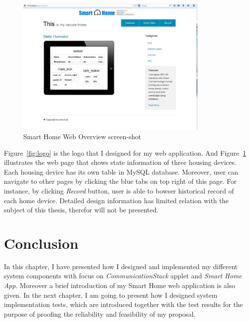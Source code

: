 \begin{figure}[!htb]
	\centering
	\includegraphics[width=0.85\textwidth]{Images/design/overview.jpg}
		\caption{Smart Home Web Overview screen-shot}
	\label{fig:smart-home-frontpage}
\end{figure}

Figure~\ref{fig:logo} is the logo that I designed for my web application. And Figure~\ref{fig:smart-home-frontpage} illustrates the web page that shows state information of three housing devices. Each housing device has its own table in MySQL database. Moreover, user can navigate to other pages by clicking the blue tabs on top right of this page. For instance, by clicking \emph{Record} button, user is able to bowser historical record of each home device. 
Detailed design information has limited relation with the subject of this thesis, therefor will not be presented.

\section{Conclusion}

In this chapter, I have presented how I designed and implemented my different system components with  focus on \emph{CommunicationStack} applet and \emph{Smart Home App}. Moreover a brief introduction of my Smart Home web application is also given. In the next chapter, I am going to present how I designed system implementation tests, which are introduced together with  the test results for the purpose of proofing the reliability and feasibility of my proposal.
